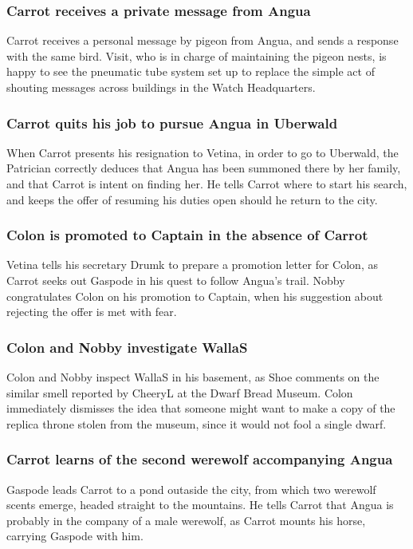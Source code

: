 \subsubsection{\Gls{Carrot} receives a private message from \Gls{Angua}}
\Gls{Carrot} receives a personal message by pigeon from \Gls{Angua}, and sends a response with the
same bird. \Gls{Visit}, who is in charge of maintaining the pigeon nests, is happy to see the
pneumatic tube system set up to replace the simple act of shouting messages across buildings in the
Watch Headquarters.

\subsubsection{\Gls{Carrot} quits his job to pursue \Gls{Angua} in Uberwald}
When \Gls{Carrot} presents his resignation to \Gls{Vetina}, in order to go to Uberwald, the
Patrician correctly deduces that \Gls{Angua} has been summoned there by her family, and that
\Gls{Carrot} is intent on finding her. He tells \Gls{Carrot} where to start his search, and keeps
the offer of resuming his duties open should he return to the city.

\subsubsection{\Gls{Colon} is promoted to Captain in the absence of \Gls{Carrot}}
\Gls{Vetina} tells his secretary \Gls{Drumk} to prepare a promotion letter for \Gls{Colon}, as
\Gls{Carrot} seeks out \Gls{Gaspode} in his quest to follow \Gls{Angua}'s trail. \Gls{Nobby}
congratulates \Gls{Colon} on his promotion to Captain, when his suggestion about rejecting the offer
is met with fear.

\subsubsection{\Gls{Colon} and \Gls{Nobby} investigate \Gls{WallaS}}
\Gls{Colon} and \Gls{Nobby} inspect \Gls{WallaS} in his basement, as \Gls{Shoe} comments on the
similar smell reported by \Gls{CheeryL} at the Dwarf Bread Museum. \Gls{Colon} immediately dismisses
the idea that someone might want to make a copy of the replica throne stolen from the museum, since
it would not fool a single dwarf.

\subsubsection{\Gls{Carrot} learns of the second werewolf accompanying \Gls{Angua}}
\Gls{Gaspode} leads \Gls{Carrot} to a pond outaside the city, from which two werewolf scents emerge,
headed straight to the mountains. He tells \Gls{Carrot} that \Gls{Angua} is probably in the company
of a male werewolf, as \Gls{Carrot} mounts his horse, carrying \Gls{Gaspode} with him.

